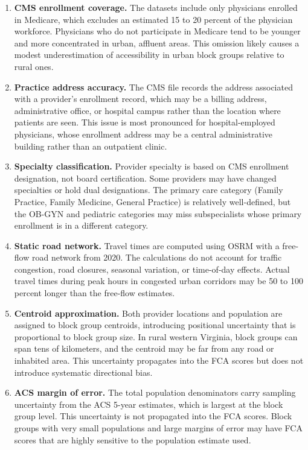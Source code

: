 \documentclass{CUP-JNL-DAP}%
\begin{document}
\begin{enumerate}
\item \textbf{CMS enrollment coverage.} The datasets include only physicians enrolled in Medicare, which excludes an estimated 15 to 20 percent of the physician workforce. Physicians who do not participate in Medicare tend to be younger and more concentrated in urban, affluent areas. This omission likely causes a modest underestimation of accessibility in urban block groups relative to rural ones.

\item \textbf{Practice address accuracy.} The CMS file records the address associated with a provider's enrollment record, which may be a billing address, administrative office, or hospital campus rather than the location where patients are seen. This issue is most pronounced for hospital-employed physicians, whose enrollment address may be a central administrative building rather than an outpatient clinic.

\item \textbf{Specialty classification.} Provider specialty is based on CMS enrollment designation, not board certification. Some providers may have changed specialties or hold dual designations. The primary care category (Family Practice, Family Medicine, General Practice) is relatively well-defined, but the OB-GYN and pediatric categories may miss subspecialists whose primary enrollment is in a different category.

\item \textbf{Static road network.} Travel times are computed using OSRM with a free-flow road network from 2020. The calculations do not account for traffic congestion, road closures, seasonal variation, or time-of-day effects. Actual travel times during peak hours in congested urban corridors may be 50 to 100 percent longer than the free-flow estimates.

\item \textbf{Centroid approximation.} Both provider locations and population are assigned to block group centroids, introducing positional uncertainty that is proportional to block group size. In rural western Virginia, block groups can span tens of kilometers, and the centroid may be far from any road or inhabited area. This uncertainty propagates into the FCA scores but does not introduce systematic directional bias.

\item \textbf{ACS margin of error.} The total population denominators carry sampling uncertainty from the ACS 5-year estimates, which is largest at the block group level. This uncertainty is not propagated into the FCA scores. Block groups with very small populations and large margins of error may have FCA scores that are highly sensitive to the population estimate used.


\end{enumerate}
\end{document}
